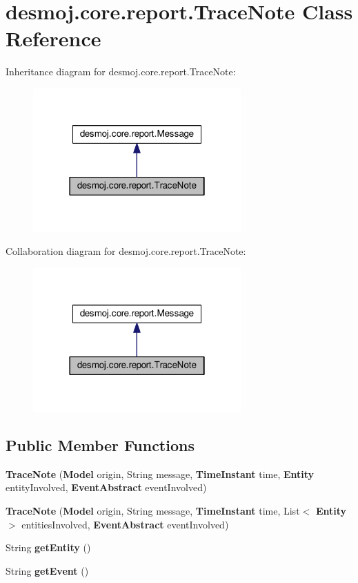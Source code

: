 \section{desmoj.\-core.\-report.\-Trace\-Note Class Reference}
\label{classdesmoj_1_1core_1_1report_1_1_trace_note}


Inheritance diagram for desmoj.\-core.\-report.\-Trace\-Note\-:
\nopagebreak
\begin{figure}[H]
\begin{center}
\leavevmode
\includegraphics[width=226pt]{classdesmoj_1_1core_1_1report_1_1_trace_note__inherit__graph}
\end{center}
\end{figure}


Collaboration diagram for desmoj.\-core.\-report.\-Trace\-Note\-:
\nopagebreak
\begin{figure}[H]
\begin{center}
\leavevmode
\includegraphics[width=226pt]{classdesmoj_1_1core_1_1report_1_1_trace_note__coll__graph}
\end{center}
\end{figure}
\subsection*{Public Member Functions}
\begin{DoxyCompactItemize}
\item 
{\bf Trace\-Note} ({\bf Model} origin, String message, {\bf Time\-Instant} time, {\bf Entity} entity\-Involved, {\bf Event\-Abstract} event\-Involved)
\item 
{\bf Trace\-Note} ({\bf Model} origin, String message, {\bf Time\-Instant} time, List$<$ {\bf Entity} $>$ entities\-Involved, {\bf Event\-Abstract} event\-Involved)
\item 
String {\bf get\-Entity} ()
\item 
String {\bf get\-Event} ()
\end{DoxyCompactItemize}


